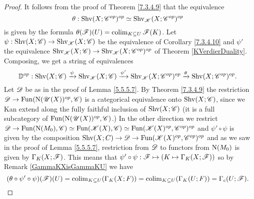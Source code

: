 \documentclass[../../thesis.tex]{subfiles}
\begin{document}
\begin{proof}
    It follows from the proof of Theorem \ref{7.3.4.9} that the equivalence
    \[
        \theta: \mathrm{Shv}(X;\mathscr{C}^{op})^{op} \simeq \mathrm{Shv}_{\mathscr{K}}(X;\mathscr{C}^{op})^{op}
    \]
    is given by the formula $\theta(\mathscr{F})(U) = \operatorname{colim}_{K\subseteq U}\mathscr{F}(K)$.
    Let $\psi: \mathrm{Shv}(X;\mathscr{C}) \to \mathrm{Shv}_{\mathscr{K}}(X;\mathscr{C})$ be the equivalence of Corollary \ref{7.3.4.10} and $\psi'$ the equivalence $\mathrm{Shv}_{\mathscr{K}}(X;\mathscr{C}) \to \mathrm{Shv}_{\mathscr{K}}(X;\mathscr{C}^{op})^{op}$ of Theorem \ref{KVerdierDuality}.
    Composing, we get a string of equivalences
    \[
        \mathbb{D}^{op} : \mathrm{Shv}(X;\mathscr{C}) \xrightarrow{\psi} \mathrm{Shv}_{\mathscr{K}}(X;\mathscr{C}) \xrightarrow{\psi'} \mathrm{Shv}_{\mathscr{K}}(X;\mathscr{C}^{op})^{op} \xrightarrow{\theta} \mathrm{Shv}(X;\mathscr{C}^{op})^{op}.
    \]
    Let $\mathscr{D}$ be as in the proof of Lemma \ref{5.5.5.7}.
    By Theorem \ref{7.3.4.9} the restriction $\mathscr{D}\to \mathrm{Fun}(\mathrm{N}(\mathscr{U}(X))^{op}, \mathscr{C})$ is a categorical equivalence onto $\mathrm{Shv}(X;\mathscr{C})$, since we Kan extend along the fully faithful inclusion of $\mathrm{Shv}(X;\mathscr{C})$ (it is a full subcategory of $\mathrm{Fun}(\mathrm{N}(\mathscr{U}(X))^{op}, \mathscr{C})$.)
    \newline
    In the other direction we restrict $\mathscr{D} \to \mathrm{Fun}(\mathrm{N}(M_0), \mathscr{C}) \simeq \mathrm{Fun}(\mathscr{K}(X), \mathscr{C}) \simeq \mathrm{Fun}(\mathscr{K}(X)^{op}, \mathscr{C}^{op})^{op}$ and $\psi' \circ \psi$ is given by the composition $\mathrm{Shv}(X;C) \to \mathscr{D} \to \mathrm{Fun}(\mathscr{K}(X)^{op}, \mathscr{C}^{op})^{op}$ and as we saw in the proof of Lemma \ref{5.5.5.7}, restriction from $\mathscr{D}$ to functors from $\mathrm{N}(M_0)$ is given by $\Gamma_K(X;\mathscr{F})$.
    This means that $\psi' \circ \psi : \mathscr{F} \mapsto \left( K \mapsto \Gamma_K(X;\mathscr{F}) \right)$ so by Remark \ref{GammaKXisGammaKU} we have
    \[
        (\theta \circ \psi' \circ \psi)(\mathscr{F})(U) = \operatorname{colim}_{K\subseteq U}(\Gamma_K(X;F)) = \operatorname{colim}_{K\subseteq U}(\Gamma_K(U;F)) = \Gamma_c(U;\mathscr{F}).
    \]
\end{proof}
\end{document}
